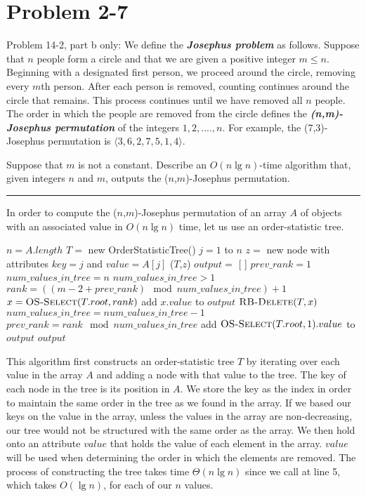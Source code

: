 \documentclass[11pt]{article}
\def\separateline{\medskip\hrule\medskip}
\begin{document}
\newpage

\section{Problem 2-7}
Problem 14-2, part b only: We define the \textbf{\textit{Josephus problem}} as follows. Suppose that $n$ people form a circle and that we are given a positive integer $m \leq n$. Beginning with a designated first person, we proceed around the circle, removing every $m$th person. After each person is removed, counting continues around the circle that remains. This process continues until we have removed all $n$ people. The order in which the people are removed from the circle defines the \textbf{\textit{(n,m)-Josephus permutation}} of the integers $1,2,....,n$. For example, the (7,3)-Josephus permutation is $\langle 3,6,2,7,5,1,4 \rangle$.

Suppose that $m$ is not a constant. Describe an $O(n\lg{n})$-time algorithm that, given integers $n$ and $m$, outputs the ($n$,$m$)-Josephus permutation.
\separateline

In order to compute the ($n$,$m$)-Josephus permutation of an array $A$ of objects with an associated value in $O(n\lg{n})$ time, let us use an order-statistic tree.

\begin{codebox}
\li $n = A.length$
\li $T = $ new OrderStatisticTree()
\li \For $j=1$ to $n$ \Do
\li     $z = $ new node with attributes $key = j$ and $value = A[j]$
\li     {}($T$,$z$)
\li \End
\li $output =$ [ ]
\li $prev\_rank = 1$
\li $num\_values\_in\_tree = n$
\li
\li \While $num\_values\_in\_tree > 1$ \Do
\li     $rank = ((m - 2 + prev\_rank) \mod num\_values\_in\_tree) + 1$
\li     $x = \textnormal{\scshape OS-Select}(T.root, rank)$
\li     add $x.value$ to $output$
\li     $\textnormal{\scshape RB-Delete}(T,x)$
\li     $num\_values\_in\_tree = num\_values\_in\_tree - 1$
\li     $prev\_rank = rank \mod num\_values\_in\_tree$
\li \End
\li add $\textnormal{\scshape OS-Select}(T.root, 1).value$ to $output$
\li \Return $output$
\end{codebox}

This algorithm first constructs an order-statistic tree $T$ by iterating over each value in the array $A$ and adding a node with that value to the tree. The key of each node in the tree is its position in $A$. We store the key as the index in order to maintain the same order in the tree as we found in the array. If we based our keys on the value in the array, unless the values in the array are non-decreasing, our tree would not be structured with the same order as the array. We then hold onto an attribute $value$ that holds the value of each element in the array. $value$ will be used when determining the order in which the elements are removed. The process of constructing the tree takes time $\Theta(n\lg{n})$ since we call  at line 5, which takes $O(\lg{n})$, for each of our $n$ values.
\end{document}
